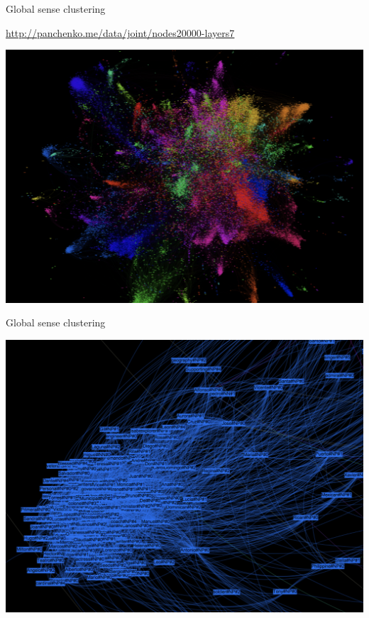 \begin{frame}{Global sense clustering}


\vspace{-10pt}
{\footnotesize \underline{\url{http://panchenko.me/data/joint/nodes20000-layers7}}}


\begin{center}
\includegraphics[width=.75\textwidth]{figures/structure}
\end{center}

\end{frame}



\begin{frame}{Global sense clustering}

\begin{center}
\includegraphics[width=.75\textwidth]{figures/structure1}
\end{center}

\end{frame}



